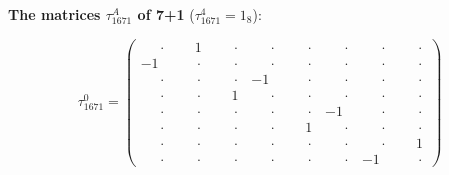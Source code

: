 \documentclass[
  10pt,
]{article}
\begin{document}
\textbf{The matrices \(\tau_{1671}^A\) of 7+1} (\(\tau_{1671}^4=1_8\)):

\[
\tau_{1671}^{0} = \left(\begin{array}{rrrr|rrrr}
\phantom{-}\cdot & \phantom{-}1 & \phantom{-}\cdot & \phantom{-}\cdot & \phantom{-}\cdot & \phantom{-}\cdot & \phantom{-}\cdot & \phantom{-}\cdot \\[-1.8pt]
-1 & \phantom{-}\cdot & \phantom{-}\cdot & \phantom{-}\cdot & \phantom{-}\cdot & \phantom{-}\cdot & \phantom{-}\cdot & \phantom{-}\cdot \\[-1.8pt]
\phantom{-}\cdot & \phantom{-}\cdot & \phantom{-}\cdot & -1 & \phantom{-}\cdot & \phantom{-}\cdot & \phantom{-}\cdot & \phantom{-}\cdot \\[-1.8pt]
\phantom{-}\cdot & \phantom{-}\cdot & \phantom{-}1 & \phantom{-}\cdot & \phantom{-}\cdot & \phantom{-}\cdot & \phantom{-}\cdot & \phantom{-}\cdot \\[-1.8pt]
\hline
\phantom{-}\cdot & \phantom{-}\cdot & \phantom{-}\cdot & \phantom{-}\cdot & \phantom{-}\cdot & -1 & \phantom{-}\cdot & \phantom{-}\cdot \\[-1.8pt]
\phantom{-}\cdot & \phantom{-}\cdot & \phantom{-}\cdot & \phantom{-}\cdot & \phantom{-}1 & \phantom{-}\cdot & \phantom{-}\cdot & \phantom{-}\cdot \\[-1.8pt]
\phantom{-}\cdot & \phantom{-}\cdot & \phantom{-}\cdot & \phantom{-}\cdot & \phantom{-}\cdot & \phantom{-}\cdot & \phantom{-}\cdot & \phantom{-}1 \\[-1.8pt]
\phantom{-}\cdot & \phantom{-}\cdot & \phantom{-}\cdot & \phantom{-}\cdot & \phantom{-}\cdot & \phantom{-}\cdot & -1 & \phantom{-}\cdot
\end{array}\right)
\]
\end{document}
